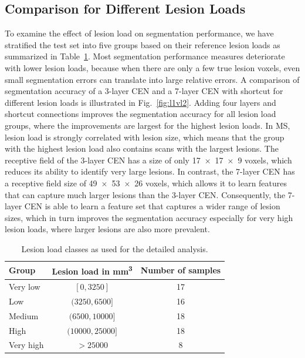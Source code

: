\subsection{Comparison for Different Lesion Loads}

To examine the effect of lesion load on segmentation performance, we have
stratified the test set into five groups based on their reference lesion loads
as summarized in Table~\ref{tab:groups}. Most segmentation performance measures
deteriorate with lower lesion loads, because when there are only a few true
lesion voxels, even small segmentation errors can translate into large relative
errors. A comparison of segmentation accuracy of a 3-layer CEN and a 7-layer CEN
with shortcut for different lesion loads is illustrated in
Fig.~\ref{fig:l1vl2}. Adding four layers and shortcut connections improves the
segmentation accuracy for all lesion load groups, where the improvements are
largest for the highest lesion loads. In MS, lesion load is strongly
correlated with lesion size, which means that the group with the highest lesion
load also contains scans with the largest lesions. The receptive field of the
3-layer CEN has a size of only \num{17x17x9} voxels, which reduces its ability
to identify very large lesions. In contrast, the 7-layer CEN has a receptive
field size of \num{49x53x26} voxels, which allows it to learn features that can
capture much larger lesions than the 3-layer CEN. Consequently, the 7-layer CEN
is able to learn a feature set that captures a wider range of lesion sizes,
which in turn improves the segmentation accuracy especially for very high lesion
loads, where larger lesions are also more prevalent.

\begin{table}[tb]
\caption[Lesion load classes as used for the detailed analysis]{Lesion load
classes as used for the detailed analysis.}
\label{tab:groups}
\begin{center}
\begin{tabular}{@{}lcc@{}}
\toprule
Group & Lesion load in \si{\cubic\milli\metre} & Number of samples \\
\midrule
Very low & $[0,3250]$ & 17 \\
Low      & $(3250,6500]$ & 16 \\
Medium & $(6500,10000]$ & 18 \\
High & $(10000,25000]$ & 18 \\
Very high & $> 25000$ & 8 \\
\bottomrule
\end{tabular}
\end{center}
\end{table}

